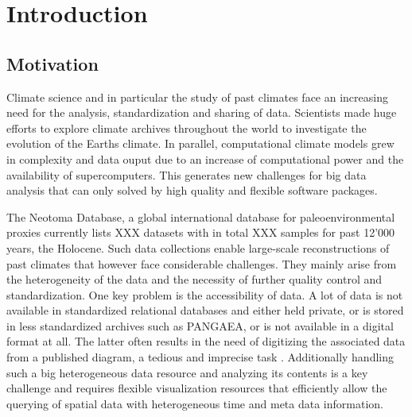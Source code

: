 
\chapter{Introduction}

\label{chp:intro}

\begin{refsection}


\section{Motivation} \label{sec:motivation}

Climate science and in particular the study of past climates face an increasing need for the analysis, standardization and sharing of data. Scientists made huge efforts to explore climate archives throughout the world to investigate the evolution of the Earths climate\addref. In parallel, computational climate models grew in complexity and data ouput due to an increase of computational power and the availability of supercomputers\addref. This generates new challenges for big data analysis that can only solved by high quality and flexible software packages.

The Neotoma Database, a global international database for paleoenvironmental proxies \citep{WilliamsGrimmBloisEtAl2018} currently lists XXX datasets with in total XXX samples for past 12'000 years, the Holocene. Such data collections enable large-scale reconstructions of past climates that however face considerable challenges. They mainly arise from the heterogeneity of the data and the necessity of further quality control and standardization. One key problem is the accessibility of data. A lot of data is not available in standardized relational databases and either held private, or is stored in less standardized archives such as PANGAEA, or is not available in a digital format at all. The latter often results in the need of digitizing the associated data from a published diagram, a tedious and imprecise task \citep{SommerRechChevalierEtAl2019}. Additionally handling such a big heterogeneous data resource and analyzing its contents is a key challenge and requires flexible visualization resources that efficiently allow the querying of spatial data with heterogeneous time and meta data information.


\end{refsection}

